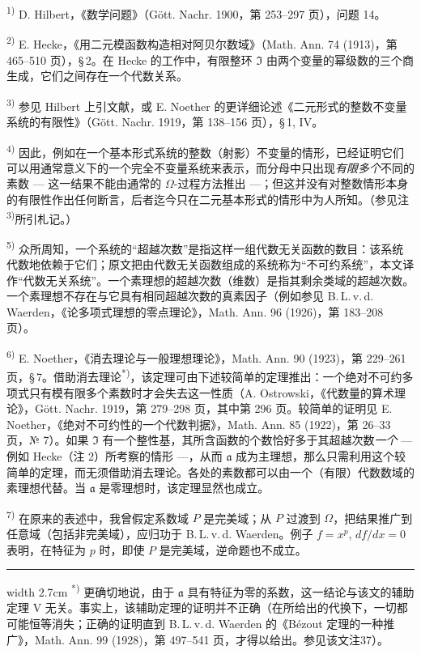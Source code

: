 {\small
\setlength{\parindent}{0pt}
\noindent\textsuperscript{1)} D. Hilbert，《数学问题》（Gött. Nachr. 1900，第 253--297 页），问题 14。

\noindent\textsuperscript{2)} E. Hecke，《用二元模函数构造相对阿贝尔数域》（Math. Ann. 74 (1913)，第 465--510 页），\S\,2。在 Hecke 的工作中，有限整环 $\mathfrak{I}$ 由两个变量的幂级数的三个商生成，它们之间存在一个代数关系。

\noindent\textsuperscript{3)} 参见 Hilbert 上引文献，或 E. Noether 的更详细论述《二元形式的整数不变量系统的有限性》（Gött. Nachr. 1919，第 138--156 页），\S\,1, IV。

\noindent\textsuperscript{4)} 因此，例如在一个基本形式系统的整数（射影）不变量的情形，已经证明它们可以用通常意义下的一个完全不变量系统来表示，而分母中只出现\emph{有限多个}不同的素数 --- 这一结果不能由通常的 $\Omega$-过程方法推出 ---；但这并没有对整数情形本身的有限性作出任何断言，后者迄今只在二元基本形式的情形中为人所知。（参见注\textsuperscript{3)}所引札记。）

\noindent\textsuperscript{5)} 众所周知，一个系统的“超越次数”是指这样一组代数无关函数的数目：该系统代数地依赖于它们；原文把由代数无关函数组成的系统称为“不可约系统”，本文译作“代数无关系统”。一个素理想的超越次数（维数）是指其剩余类域的超越次数。一个素理想不存在与它具有相同超越次数的真素因子（例如参见 B.\,L.\,v.\,d. Waerden，《论多项式理想的零点理论》，Math. Ann. 96 (1926)，第 183--208 页）。

\noindent\textsuperscript{6)} E. Noether，《消去理论与一般理想理论》，Math. Ann. 90 (1923)，第 229--261 页，\S\,7。借助消去理论\textsuperscript{*)}，该定理可由下述较简单的定理推出：一个绝对不可约多项式只有模有限多个素数时才会失去这一性质（A. Ostrowski，《代数量的算术理论》，Gött. Nachr. 1919，第 279--298 页，其中第 296 页。较简单的证明见 E. Noether，《绝对不可约性的一个代数判据》，Math. Ann. 85 (1922)，第 26--33 页，№ 7）。如果 $\mathfrak{I}$ 有一个整性基，其所含函数的个数恰好多于其超越次数\emph{一个} --- 例如 Hecke（注 2）所考察的情形 ---，从而 $\mathfrak{a}$ 成为主理想，那么只需利用这个较简单的定理，而无须借助消去理论。各处的素数都可以由一个（有限）代数数域的素理想代替。当 $\mathfrak{a}$ 是零理想时，该定理显然也成立。

\noindent\textsuperscript{7)} 在原来的表述中，我曾假定系数域 $P$ 是完美域；从 $P$ 过渡到 $\Omega$，把结果推广到任意域（包括非完美域），应归功于 B.\,L.\,v.\,d. Waerden。例子 $f=x^p$, $df/dx=0$ 表明，在特征为 $p$ 时，即使 $P$ 是完美域，逆命题也不成立。

\medskip
\hrule width 2.7cm
\smallskip
\noindent\textsuperscript{*)} 更确切地说，由于 $\mathfrak{a}$ 具有特征为零的系数，这一结论与该文的辅助定理 V 无关。事实上，该辅助定理的证明并不正确（在所给出的代换下，一切都可能恒等消失；正确的证明直到 B.\,L.\,v.\,d. Waerden 的《Bézout 定理的一种推广》，Math. Ann. 99 (1928)，第 497--541 页，才得以给出。参见该文注37）。

}
